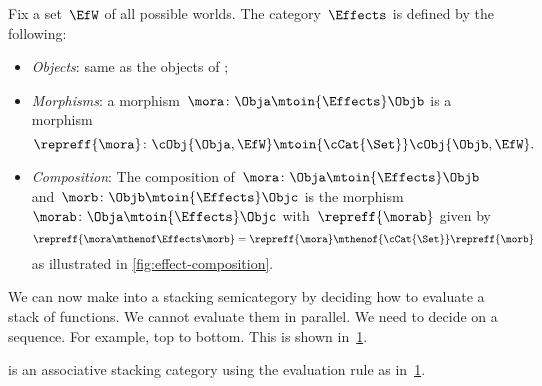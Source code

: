 \begin{definition}
    Fix a set~$\EfW$ of all possible worlds.
    The category~$\Effects$ is defined by the following:
    \begin{itemize}
        \item \emph{Objects}: same as the objects of \cCat{\Set};
        \item \emph{Morphisms}: a morphism~$\mora\colon \Obja \mtoin{\Effects} \Objb$ is a morphism
              \begin{equation}
                  \repreff{\mora}\colon \cObj{\Obja, \EfW} \mtoin{\cCat{\Set}} \cObj{\Objb, \EfW}.
              \end{equation}
        \item \emph{Composition}: The composition of~$\mora\colon \Obja \mtoin{\Effects} \Objb$ and~$\morb\colon \Objb \mtoin{\Effects} \Objc$ is the morphism~$\morab\colon \Obja \mtoin{\Effects} \Objc$ with~$\repreff{\morab}$ given by
              \begin{equation}
                  \repreff{\mora \mthenof \Effects \morb}
                  = \repreff{\mora} \mthenof{\cCat{\Set}} \repreff{\morb}
              \end{equation}
              as illustrated in \cref{fig:effect-composition}.
    \end{itemize}
\end{definition}

We can now make \Effects into a stacking semicategory by deciding how to evaluate a stack of functions.
We cannot evaluate them in parallel.
We need to decide on a sequence.
For example, top to bottom.
This is shown in~\cref{fig:effect-stacking}.

\begin{lemma}
    \label{lem:effects-is-stacking}
    \Effects is an associative stacking category using the evaluation rule as in~\cref{fig:effect-stacking}.
\end{lemma}

\begin{figure}[h!]
    \centering
    \caption{}
    \label{fig:effect-stacking}
\end{figure}

